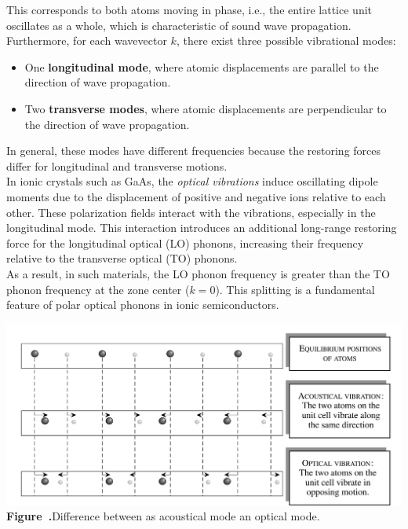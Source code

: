 This corresponds to both atoms moving in phase, i.e., the entire lattice unit oscillates as a whole, which is characteristic of sound wave propagation.
Furthermore, for each wavevector \( k \), there exist three possible vibrational modes:
\begin{itemize}
	\item One \textbf{longitudinal mode}, where atomic displacements are parallel to the direction of wave propagation.
	\item Two \textbf{transverse modes}, where atomic displacements are perpendicular to the direction of wave propagation.
\end{itemize}
In general, these modes have different frequencies because the restoring forces differ for longitudinal and transverse motions.\\
In ionic crystals such as GaAs, the \textit{optical vibrations} induce oscillating dipole moments due to the displacement of positive and negative ions relative to each other. These polarization fields interact with the vibrations, especially in the longitudinal mode. This interaction introduces an additional long-range restoring force for the longitudinal optical (LO) phonons, increasing their frequency relative to the transverse optical (TO) phonons.\\
As a result, in such materials, the LO phonon frequency is greater than the TO phonon frequency at the zone center (\( k = 0 \)). This splitting is a fundamental feature of polar optical phonons in ionic semiconductors.
\begin{center}
	\begin{minipage}{0.9\textwidth}
		\centering
		\includegraphics[width=\textwidth]{img/acoustic&opticalmode.png}
		\\[0.5em]
		\textbf{Figure~\thefigure.}Difference between as acoustical mode an optical mode.
		\label{fig:OpticalVSAcoustic_differences}
	\end{minipage}
\end{center}


